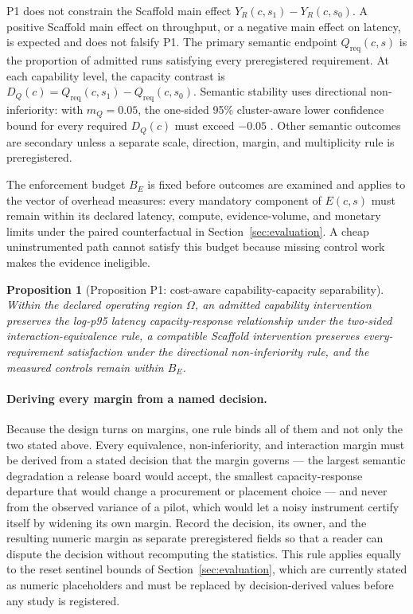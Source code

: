 \documentclass[11pt]{article}
\newtheorem{proposition}{Proposition}
\begin{document}
P1 does not constrain the Scaffold main effect $Y_R(c,s_1)-Y_R(c,s_0)$. A positive Scaffold main effect on throughput, or a negative main effect on latency, is expected and does not falsify P1. The primary semantic endpoint $Q_{\mathrm{req}}(c,s)$ is the proportion of admitted runs satisfying every preregistered requirement. At each capability level, the capacity contrast is $D_Q(c)=Q_{\mathrm{req}}(c,s_1)-Q_{\mathrm{req}}(c,s_0)$. Semantic stability uses directional non-inferiority: with $m_Q=0.05$, the one-sided 95\% cluster-aware lower confidence bound for every required $D_Q(c)$ must exceed $-0.05$ \cite{piaggio2012noninferiority}. Other semantic outcomes are secondary unless a separate scale, direction, margin, and multiplicity rule is preregistered.

The enforcement budget $B_E$ is fixed before outcomes are examined and applies to the vector of overhead measures: every mandatory component of $E(c,s)$ must remain within its declared latency, compute, evidence-volume, and monetary limits under the paired counterfactual in Section~\ref{sec:evaluation}. A cheap uninstrumented path cannot satisfy this budget because missing control work makes the evidence ineligible.

\begin{proposition}[Proposition P1: cost-aware capability-capacity separability]
\label{prop:p1}
Within the declared operating region $\Omega$, an admitted capability intervention preserves the log-p95 latency capacity-response relationship under the two-sided interaction-equivalence rule, a compatible Scaffold intervention preserves every-requirement satisfaction under the directional non-inferiority rule, and the measured controls remain within $B_E$.
\end{proposition}

\paragraph{Deriving every margin from a named decision.}
Because the design turns on margins, one rule binds all of them and not only the two stated above. Every equivalence, non-inferiority, and interaction margin must be derived from a stated decision that the margin governs --- the largest semantic degradation a release board would accept, the smallest capacity-response departure that would change a procurement or placement choice --- and never from the observed variance of a pilot, which would let a noisy instrument certify itself by widening its own margin. Record the decision, its owner, and the resulting numeric margin as separate preregistered fields so that a reader can dispute the decision without recomputing the statistics. This rule applies equally to the reset sentinel bounds of Section~\ref{sec:evaluation}, which are currently stated as numeric placeholders and must be replaced by decision-derived values before any study is registered.
\end{document}

